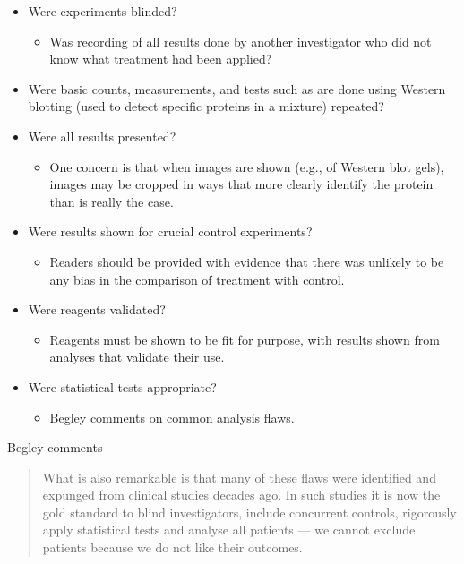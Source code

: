 \documentclass[
  10ptls,
  b5paper]{book}
\providecommand{\tightlist}{%
  \setlength{\itemsep}{0pt}\setlength{\parskip}{0pt}}
\begin{document}
\begin{itemize}
\tightlist
\item
  Were experiments blinded?

  \begin{itemize}
  \tightlist
  \item
    Was recording of all results done by another investigator
    who did not know what treatment had been applied?
  \end{itemize}
\item
  Were basic counts, measurements, and tests such as are done
  using Western blotting (used to detect specific proteins in a
  mixture) repeated?
\item
  Were all results presented?

  \begin{itemize}
  \tightlist
  \item
    One concern is that when images are shown (e.g., of Western
    blot gels), images may be cropped in ways that more clearly
    identify the protein than is really the case.
  \end{itemize}
\item
  Were results shown for crucial control experiments?

  \begin{itemize}
  \tightlist
  \item
    Readers should be provided with evidence that there was
    unlikely to be any bias in the comparison of treatment
    with control.
  \end{itemize}
\item
  Were reagents validated?

  \begin{itemize}
  \tightlist
  \item
    Reagents must be shown to be fit for purpose, with results
    shown from analyses that validate their use.
  \end{itemize}
\item
  Were statistical tests appropriate?

  \begin{itemize}
  \tightlist
  \item
    Begley comments on common analysis flaws.
  \end{itemize}
\end{itemize}

Begley comments

\begin{quote}
What is also remarkable is that many of these flaws were
identified and expunged from clinical studies decades ago.
In such studies it is now the gold standard to blind investigators,
include concurrent controls, rigorously apply statistical tests
and analyse all patients --- we cannot exclude patients because
we do not like their outcomes.
\end{quote}
\end{document}
